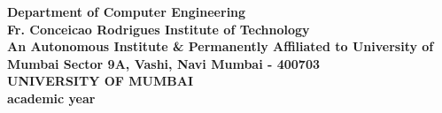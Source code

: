 \begin{titlepage}
{{\bf Department of Computer Engineering \\
\vspace{0.2cm}
\bf {Fr. Conceicao Rodrigues Institute of Technology}\\
\bf{ An Autonomous Institute & Permanently Affiliated to University of Mumbai}
\bf Sector 9A, Vashi, Navi Mumbai - 400703} \\
{\centering
\hspace{.5cm}
{\centering
{\bf UNIVERSITY OF MUMBAI} \\
\vspace{0.2cm}}
\bf{ academic year} \\
}

}\end{titlepage} 